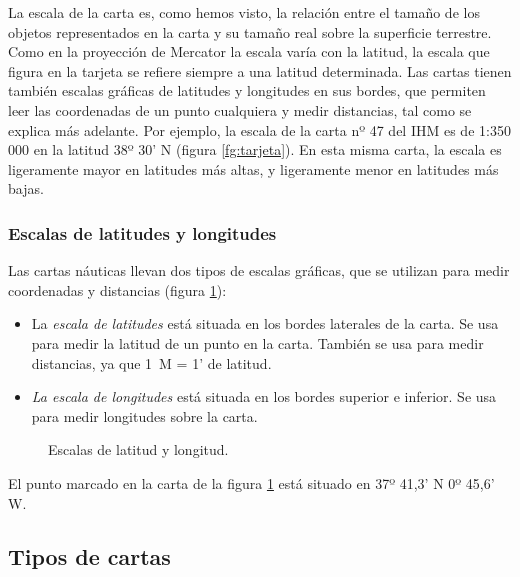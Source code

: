 La escala de la carta es, como hemos visto, la relación entre el tamaño de los objetos 
representados en la carta y su tamaño real sobre la superficie terrestre. Como en la proyección de Mercator la escala varía con la latitud, la escala que figura en la tarjeta se 
refiere siempre a una latitud determinada. Las cartas tienen también escalas gráficas de 
latitudes y longitudes en sus bordes, que permiten leer las coordenadas de un punto cualquiera y medir distancias, tal como se explica más adelante. Por ejemplo, la escala de la 
carta nº 47 del IHM es de 1:350 000 en la latitud 38º 30’ N (figura \ref{fg:tarjeta}). En esta misma 
carta, la escala es ligeramente mayor en latitudes más altas, y ligeramente menor en latitudes más bajas. 

\subsubsection{Escalas de latitudes y longitudes }


Las cartas náuticas llevan dos tipos de escalas gráficas, que se utilizan para medir coordenadas y distancias (figura \ref{fg:escala-grafica}): 
\begin{itemize}
\item La \emph{escala de latitudes} está situada en los bordes laterales de la carta. Se usa para 
medir la latitud de un punto en la carta. También se usa para medir distancias, ya 
que 1~M = 1’ de latitud. 
\item \emph{La escala de longitudes} está situada en los bordes superior e inferior. Se usa para 
medir longitudes sobre la carta. 
\end{itemize}

\begin{figure}[hbtp]
\begin{center}
\caption{Escalas de latitud y longitud.}
\label{fg:escala-grafica}
\end{center}
\end{figure}

\begin{ejemplo}
El punto marcado en la carta de la figura  \ref{fg:escala-grafica} está situado en 37º 41,3’ N  0º 45,6’ W.
\end{ejemplo}

\subsection{Tipos de cartas}

